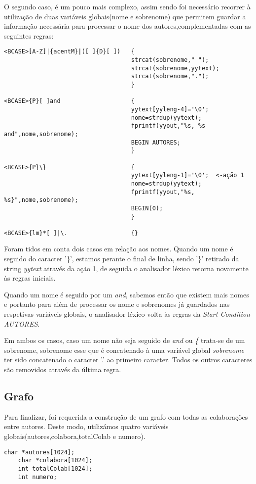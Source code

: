 O segundo caso, é um pouco mais complexo, assim sendo foi necessário recorrer à utilização de duas variáveis globais(nome e sobrenome) que permitem guardar a informação necessária para processar o nome dos autores,complementadas com as seguintes regras:
\begin{verbatim}
<BCASE>[A-Z]|{acentM}|([ ]{D}[ ])   {
                                    strcat(sobrenome," ");
                                    strcat(sobrenome,yytext);
                                    strcat(sobrenome,".");
                                    }
                                    
<BCASE>{P}[ ]and                    {
                                    yytext[yyleng-4]='\0';
                                    nome=strdup(yytext);
                                    fprintf(yyout,"%s, %s and",nome,sobrenome);
                                    BEGIN AUTORES;
                                    }
                                    
<BCASE>{P}\}                        {
                                    yytext[yyleng-1]='\0';  <-ação 1
                                    nome=strdup(yytext);
                                    fprintf(yyout,"%s, %s}",nome,sobrenome);
                                    BEGIN(0);
                                    }
                                    
<BCASE>{lm}*[ ]|\.                  {} 
\end{verbatim}

Foram tidos em conta dois casos em relação aos nomes. 
Quando um nome é seguido do caracter '\}', estamos perante o final de linha, sendo '\}' retirado da string \emph{yytext} através da ação 1, de seguida o analisador léxico retorna novamente às regras iniciais.

Quando um nome é seguido por um \emph{and}, sabemos então que existem mais nomes e portanto para além de processar os nome e sobrenomes já guardados nas respetivas variáveis globais, o analisador léxico volta às regras da \emph{Start Condition AUTORES}.

Em ambos os casos, caso um nome não seja seguido de \emph{and} ou \emph{\{} trata-se de um sobrenome, sobrenome esse que é concatenado à uma variável global \emph{sobrenome} ter sido concatenado o caracter '.' ao primeiro caracter. Todos os outros caracteres são removidos através da última regra.

\subsection{Grafo}
Para finalizar, foi requerida a construção de um grafo com todas as colaborações entre autores. Deste modo, utilizámos quatro variáveis globais(autores,colabora,totalColab e numero).
\begin{center}
\begin{minipage}{8cm}
\begin{verbatim}
char *autores[1024];
	char *colabora[1024];
	int totalColab[1024];
	int numero;
\end{verbatim}
\end{minipage}
\end{center}

